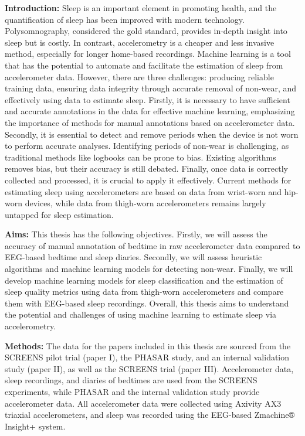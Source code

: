 \documentclass[
  10pt,
]{scrbook}
\begin{document}
\textbf{Introduction:} Sleep is an important element in promoting
health, and the quantification of sleep has been improved with modern
technology. Polysomnography, considered the gold standard, provides
in-depth insight into sleep but is costly. In contrast, accelerometry is
a cheaper and less invasive method, especially for longer home-based
recordings. Machine learning is a tool that has the potential to
automate and facilitate the estimation of sleep from accelerometer data.
However, there are three challenges: producing reliable training data,
ensuring data integrity through accurate removal of non-wear, and
effectively using data to estimate sleep. Firstly, it is necessary to
have sufficient and accurate annotations in the data for effective
machine learning, emphasizing the importance of methods for manual
annotations based on accelerometer data. Secondly, it is essential to
detect and remove periods when the device is not worn to perform
accurate analyses. Identifying periods of non-wear is challenging, as
traditional methods like logbooks can be prone to bias. Existing
algorithms removes bias, but their accuracy is still debated. Finally,
once data is correctly collected and processed, it is crucial to apply
it effectively. Current methods for estimating sleep using
accelerometers are based on data from wrist-worn and hip-worn devices,
while data from thigh-worn accelerometers remains largely untapped for
sleep estimation.

\textbf{Aims:} This thesis has the following objectives. Firstly, we
will assess the accuracy of manual annotation of bedtime in raw
accelerometer data compared to EEG-based bedtime and sleep diaries.
Secondly, we will assess heuristic algorithms and machine learning
models for detecting non-wear. Finally, we will develop machine learning
models for sleep classification and the estimation of sleep quality
metrics using data from thigh-worn accelerometers and compare them with
EEG-based sleep recordings. Overall, this thesis aims to understand the
potential and challenges of using machine learning to estimate sleep via
accelerometry.

\textbf{Methods:} The data for the papers included in this thesis are
sourced from the SCREENS pilot trial (paper I), the PHASAR study, and an
internal validation study (paper II), as well as the SCREENS trial
(paper III). Accelerometer data, sleep recordings, and diaries of
bedtimes are used from the SCREENS experiments, while PHASAR and the
internal validation study provide accelerometer data. All accelerometer
data were collected using Axivity AX3 triaxial accelerometers, and sleep
was recorded using the EEG-based Zmachine® Insight+ system.
\end{document}
